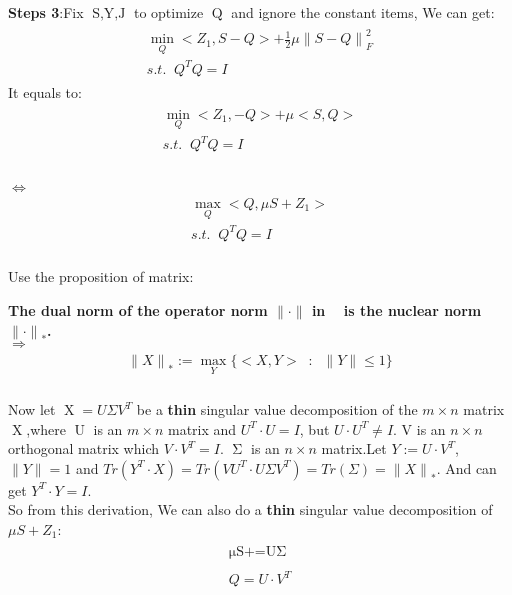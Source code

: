 \documentclass{article}
\begin{document}
\begin{flushleft}
\textbf{Steps 3}:\;\;Fix $\mathop{S,Y,J}$ to optimize $\mathop{Q}$ and ignore the constant items, We can get:
\begin{eqnarray}
\begin{array}{l}
    \mathop{\min}\limits_{Q} <Z_1,S-Q> + \frac{1}{2}\mu {\parallel S - Q \parallel}_F^2  \\
    s.t. \;\; Q^TQ = I
\end{array}
\end{eqnarray}
It equals to:
\begin{eqnarray}
\begin{array}{lll}
    \mathop{\min}\limits_{Q} <Z_1,-Q> + \mu <S,Q>  \\
    s.t. \;\; Q^TQ = I \\
\end{array}
\end{eqnarray}\\
$\Longleftrightarrow$
\begin{eqnarray}
\begin{array}{lll}
    \mathop{\max}\limits_{Q} <Q,\mu S+Z_1>  \\
    s.t. \;\; Q^TQ = I
\end{array}
\end{eqnarray}\\
Use the proposition of matrix:
\end{flushleft}
\textbf{The dual norm of the operator norm $\parallel \cdot \parallel$ in $\mathop{R^{m\times n}}$ is the nuclear norm ${\parallel \cdot \parallel}_{\ast}$.}\\
$\Longrightarrow $
\begin{eqnarray}
\begin{array}{lll}
    {\parallel X\parallel}_{\ast} := \mathop{\max}\limits_{Y} \{ <X, Y> \;\; : \;\; \parallel Y\parallel \leq 1 \}
\end{array}
\end{eqnarray}\\
Now let $\mathop{X} = U\Sigma V^T $ be a \textbf{thin} singular value decomposition of the $m \times n$ matrix $\mathop{X}$,where $\mathop{U}$ is an $m \times n$ matrix and $U^T \cdot U=I$, but $U \cdot U^T \neq I$. V is an $n \times n$ orthogonal matrix which $V \cdot V^T=I$.\; $\mathop{\Sigma}$ is an $n\times n$ matrix.Let $Y :=U\cdot V^T $,$\parallel Y \parallel = 1$ and $Tr(Y^T \cdot X) = Tr(VU^T \cdot U\Sigma V^T)=Tr(\Sigma)={\parallel X\parallel}_{\ast}$. And can get $Y^T\cdot Y=I$.\\
So from this derivation, We can also do a \textbf{thin} singular value decomposition of $\mu S+Z_1 $:\\
\begin{eqnarray}
\begin{array}{lll}
\mathop{\mu S+Z_1 = U \Sigma V^T} \nonumber \\\\
Q = U\cdot V^T
\end{array}
\end{eqnarray}
\end{document}
